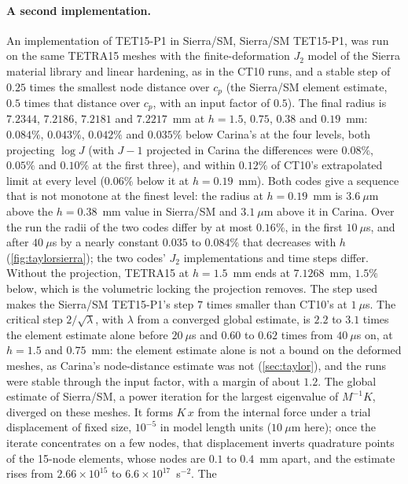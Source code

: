\documentclass{article}
\theoremstyle{definition}
\theoremstyle{plain}
\begin{document}
\paragraph{A second implementation.} An implementation of
TET15-P1 in Sierra/SM, Sierra/SM TET15-P1, was run on the same TETRA15 meshes with the
finite-deformation $J_2$ model of the Sierra material library and linear
hardening, as in the CT10 runs, and a stable step of
$0.25$ times the smallest node distance over $c_p$ (the Sierra/SM element
estimate, $0.5$ times that distance over $c_p$, with an input factor of
$0.5$). The
final radius is $7.2344$, $7.2186$, $7.2181$ and $7.2217$~mm at $h = 1.5$,
$0.75$, $0.38$ and $0.19$~mm: $0.084\%$, $0.043\%$, $0.042\%$ and $0.035\%$
below Carina's at the four levels, both projecting $\log J$ (with $J - 1$
projected in Carina the differences were $0.08\%$, $0.05\%$ and $0.10\%$ at
the first three), and within $0.12\%$ of CT10's extrapolated limit at every
level ($0.06\%$ below it at $h = 0.19$~mm). Both codes give a sequence that
is not monotone at the finest level: the radius at $h = 0.19$~mm is
$3.6~\mu$m above the $h = 0.38$~mm value in Sierra/SM and $3.1~\mu$m above it
in Carina.
Over the run the radii of the two codes differ by at most $0.16\%$, in the
first $10~\mu$s, and after $40~\mu$s by a nearly constant $0.035$ to $0.084\%$
that decreases with $h$ (\cref{fig:taylorsierra}); the two codes'
$J_2$ implementations and time steps differ. Without the projection,
TETRA15 at $h = 1.5$~mm ends at $7.1268$~mm, $1.5\%$ below, which is the
volumetric locking the projection removes. The step used makes the
Sierra/SM TET15-P1's step $7$ times smaller than CT10's at
$1~\mu$s. The critical step $2/\sqrt{\lambda}$, with $\lambda$ from a
converged global estimate, is $2.2$ to $3.1$ times the element estimate
alone before $20~\mu$s and $0.60$ to $0.62$ times from $40~\mu$s on, at
$h = 1.5$ and $0.75$~mm: the element estimate alone is not a bound on the
deformed meshes, as Carina's node-distance estimate was not
(\cref{sec:taylor}), and the runs were stable through the input factor,
with a margin of about $1.2$. The global estimate of Sierra/SM,
a power iteration for the largest eigenvalue of $M^{-1}K$, diverged on these
meshes. It forms $K\,x$ from the internal force under a trial displacement
of fixed size, $10^{-5}$ in model length units ($10~\mu$m here); once the
iterate concentrates on a few nodes, that displacement inverts quadrature
points of the 15-node elements, whose nodes are $0.1$ to $0.4$~mm apart, and
the estimate rises from $2.66\times10^{15}$ to $6.6\times10^{17}$~s$^{-2}$. The
\end{document}

